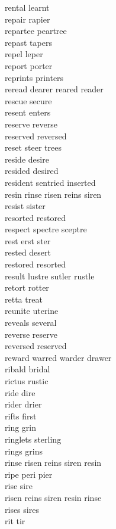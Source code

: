 rental learnt\\
repair rapier\\
repartee peartree\\
repast tapers\\
repel leper\\
report porter\\
reprints printers\\
reread dearer reared reader\\
rescue secure\\
resent enters\\
reserve reverse\\
reserved reversed\\
reset steer trees\\
reside desire\\
resided desired\\
resident sentried inserted\\
resin rinse risen reins siren\\
resist sister\\
resorted restored\\
respect spectre sceptre\\
rest erst ster\\
rested desert\\
restored resorted\\
result lustre sutler rustle\\
retort rotter\\
retta treat\\
reunite uterine\\
reveals several\\
reverse reserve\\
reversed reserved\\
reward warred warder drawer\\
ribald bridal\\
rictus rustic\\
ride dire\\
rider drier\\
rifts first\\
ring grin\\
ringlets sterling\\
rings grins\\
rinse risen reins siren resin\\
ripe peri pier\\
rise sire\\
risen reins siren resin rinse\\
rises sires\\
rit tir\\
